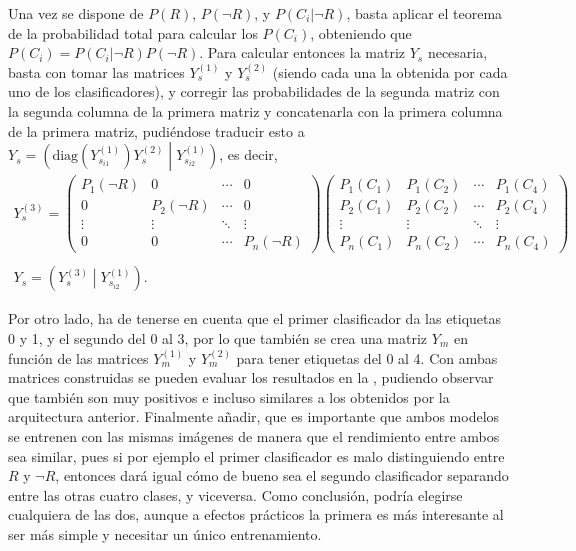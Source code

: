 				Una vez se dispone de $P(R)$, $P(\lnot R)$, y $P(C_i|\lnot R)$, basta aplicar el teorema de la probabilidad total para calcular los $P(C_i)$, obteniendo que $P(C_i) = P(C_i | \lnot R) P(\lnot R)$. Para calcular entonces la matriz $Y_s$ necesaria, basta con tomar las matrices $Y_s^{(1)}$ y $Y_s^{(2)}$ (siendo cada una la obtenida por cada uno de los clasificadores), y corregir las probabilidades de la segunda matriz con la segunda columna de la primera matriz y concatenarla con la primera columna de la primera matriz, pudiéndose traducir esto a $Y_s = \left(\text{diag}\left(Y_{s_{i1}}^{(1)}\right)Y_s^{(2)}\middle|Y_{s_{i2}}^{(1)}\right)$, es decir, 
				$$
				\begin{gathered}
					Y_s^{(3)} = \begin{pmatrix}
						P_1(\lnot R) & 0 & \cdots & 0\\
						0 & P_2(\lnot R) & \cdots & 0\\
						\vdots & \vdots & \ddots & \vdots\\
						0 & 0 & \cdots & P_n(\lnot R)
					\end{pmatrix}
					\begin{pmatrix}
						P_1(C_1) & P_1(C_2) & \cdots & P_1(C_4)\\
						P_2(C_1) & P_2(C_2) & \cdots & P_2(C_4)\\
						\vdots & \vdots & \ddots & \vdots\\
						P_n(C_1) & P_n(C_2) & \cdots & P_n(C_4)
					\end{pmatrix}\\\\
					Y_s = \left(Y_s^{(3)} \middle| Y_{s_{i2}}^{(1)}\right). 
				\end{gathered}
				$$
				
				Por otro lado, ha de tenerse en cuenta que el primer clasificador da las etiquetas 0 y 1, y el segundo del 0 al 3, por lo que también se crea una matriz $Y_m$ en función de las matrices $Y_m^{(1)}$ y $Y_m^{(2)}$ para tener etiquetas del 0 al 4. Con ambas matrices construidas se pueden evaluar los resultados en la , pudiendo observar que también son muy positivos e incluso similares a los obtenidos por la arquitectura anterior. Finalmente añadir, que es importante que ambos modelos se entrenen con las mismas imágenes de manera que el rendimiento entre ambos sea similar, pues si por ejemplo el primer clasificador es malo distinguiendo entre $R$ y $\lnot R$, entonces dará igual cómo de bueno sea el segundo clasificador separando entre las otras cuatro clases, y viceversa. Como conclusión, podría elegirse cualquiera de las dos, aunque a efectos prácticos la primera es más interesante al ser más simple y necesitar un único entrenamiento. 
				
